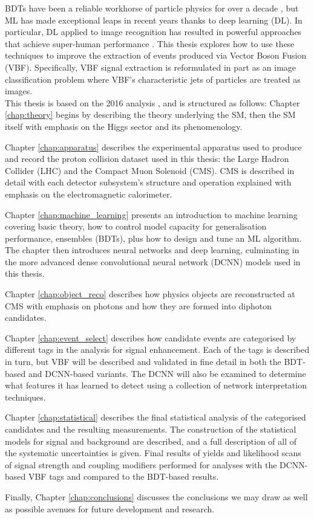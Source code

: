 BDTs have been a reliable workhorse of particle physics for over a decade \cite{MiniBooneBDT}, but ML has made exceptional leaps in recent years thanks to deep learning (DL).
In particular, DL applied to image recognition has resulted in powerful approaches that achieve super-human performance \cite{ResNet}. 
This thesis explores how to use these techniques to improve the extraction of \Hgg events produced via Vector Boson Fusion (VBF). 
Specifically, VBF signal extraction is reformulated in part as an image classification problem where VBF's characteristic jets of particles are treated as images.  
\\

This thesis is based on the 2016 \Hgg analysis \cite{HIG-16-040}, and is structured as follows: Chapter \ref{chap:theory} begins by describing the theory underlying the SM, then the SM itself with emphasis on the Higgs sector and its phenomenology. 

Chapter \ref{chap:apparatus} describes the experimental apparatus used to produce and record the proton collision dataset used in this thesis: the Large Hadron Collider (LHC) and the Compact Muon Solenoid (CMS). CMS is described in detail with each detector subsystem's structure and operation explained with emphasis on the electromagnetic calorimeter.

Chapter \ref{chap:machine_learning} presents an introduction to machine learning covering basic theory, how to control model capacity for generalisation performance, ensembles (BDTs), plus how to design and tune an ML algorithm. The chapter then introduces neural networks and deep learning, culminating in the more advanced dense convolutional neural network (DCNN) models used in this thesis. 

Chapter \ref{chap:object_reco} describes how physics objects are reconstructed at CMS with emphasis on photons and how they are formed into \Hgg diphoton candidates.

Chapter \ref{chap:event_select} describes how candidate \Hgg events are categorised by different tags in the analysis for signal enhancement.  
Each of the tags is described in turn, but VBF will be described and validated in fine detail in both the BDT-based and DCNN-based variants. 
The DCNN will also be examined to determine what features it has learned to detect using a collection of network interpretation techniques.

Chapter \ref{chap:statistical} describes the final statistical analysis of the categorised \Hgg candidates and the resulting measurements.
The construction of the statistical models for signal and background are described, and a full description of all of the systematic uncertainties is given. 
Final results of yields and likelihood scans of signal strength and coupling modifiers performed for analyses with the DCNN-based VBF tags and compared to the BDT-based results. 

Finally, Chapter \ref{chap:conclusions} discusses the conclusions we may draw as well as possible avenues for future development and research. 




